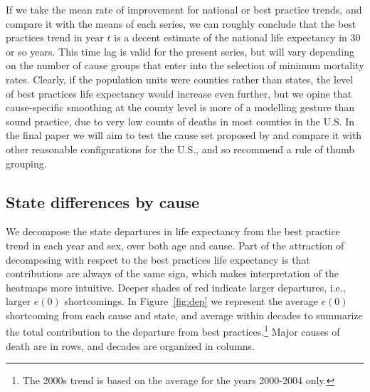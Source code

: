 \documentclass[11pt,oneside,a4paper]{article} %
\begin{document}
If we take the mean rate of improvement for national or best practice trends,
and compare it with the means of each series, we can roughly conclude that the
best practices trend in year $t$ is a decent estimate of the national life
expectancy in 30 or so years. This time lag is valid for the present series,
but will vary depending on the number of cause groups that enter into the
selection of minimum mortality rates. Clearly, if the population units were
counties rather than states, the level of best practices life expectancy would
increase even further, but we opine that cause-specific smoothing at the county
level is more of a modelling gesture than sound practice, due to very low counts of deaths in
most counties in the U.S. In the final paper we will aim to test the cause set
proposed by \citet{vallin2008minimum} and compare it with other reasonable
configurations for the U.S., and so recommend a rule of thumb grouping.

\FloatBarrier
\subsection*{State differences by cause}

We decompose the state departures in life expectancy from the best practice
trend in each year and sex, over both age and cause. Part of the attraction of decomposing with respect to the best practices life expectancy is that contributions are always
of the same sign, which makes interpretation of the heatmaps more intuitive.
Deeper shades of red indicate larger departures, i.e., larger $e(0)$
shortcomings.
In Figure~\ref{fig:dep} we represent the average $e(0)$ shortcoming from each
cause and state, and average within decades to summarize the total contribution
to the departure from best practices.\footnote{The 2000s trend is based on the average for the years 2000-2004 only.} Major causes of death are in
rows, and decades are organized in columns.
\end{document}
